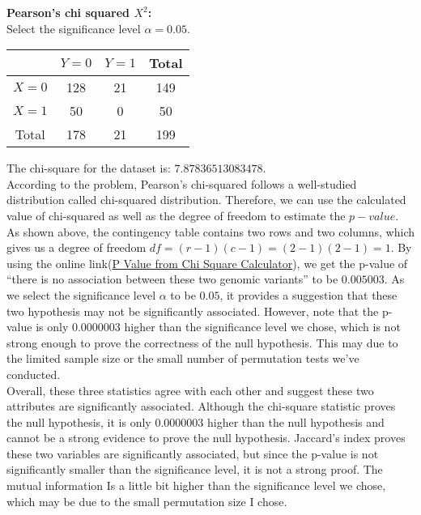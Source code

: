 \documentclass[12pt]{article}
\begin{document}
\noindent\textbf{Pearson's chi squared $X^2$: } \\
Select the significance level $\alpha = 0.05$.
\begin{center}
  \begin{tabular}{ | c | c | c | c |}
      \hline
       & $Y = 0$ & $Y = 1$ & Total\\
      \hline
      $X = 0$ & 128  & 21 & 149 \\
      \hline
      $X = 1$ & 50 & 0 & 50 \\
      \hline
      Total & 178 & 21 & 199 \\
      \hline
  \end{tabular}
\end{center}
The chi-square for the dataset is: $7.87836513083478$. \\
According to the problem, Pearson's chi-squared follows a well-studied distribution called chi-squared distribution. Therefore,
we can use the calculated value of chi-squared as well as the degree of freedom to estimate the $p-value$. As shown above, the contingency
table contains two rows and two columns, which gives us a degree of freedom $df = (r-1)(c-1) = (2-1)(2-1) = 1$.
By using the online link(\href{https://www.socscistatistics.com/pvalues/chidistribution.aspx}{P Value from Chi Square Calculator}),
we get the p-value of ``there is no association between these two genomic variants'' to be $0.005003$. As we select the significance level $\alpha$
to be $0.05$, it provides a suggestion that these two hypothesis may not be significantly associated. However, note that the p-value is only $0.0000003$
higher than the significance level we chose, which is not strong enough to prove the correctness of the null hypothesis. This may due to the limited sample
size or the small number of permutation tests we've conducted. \\

\noindent Overall, these three statistics agree with each other and suggest these two attributes are significantly associated. Although the chi-square statistic proves
the null hypothesis, it is only $0.0000003$ higher than the null hypothesis and cannot be a strong evidence to prove the null hypothesis. Jaccard's index proves these two
variables are significantly associated, but since the p-value is not significantly smaller than the significance level, it is not a strong proof. The mutual information Is
a little bit higher than the significance level we chose, which may be due to the small permutation size I chose.
\end{document}
